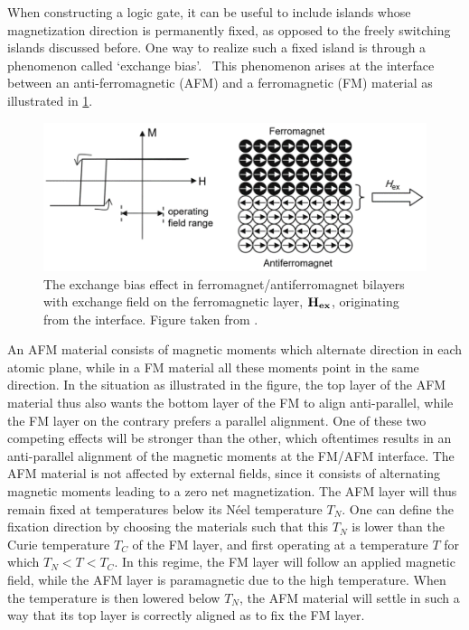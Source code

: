 \documentclass[11pt,a4paper,english]{article}
\begin{document}
When constructing a logic gate, it can be useful to include islands whose magnetization direction is permanently fixed, as opposed to the freely switching islands discussed before. One way to realize such a fixed island is through a phenomenon called `exchange bias'.~\cite{ExchangeBias_Mechanisms,ExchangeBias_nanostructures,ExchangeBias,syllabus_PoAEaPD} This phenomenon arises at the interface between an anti-ferromagnetic (AFM) and a ferromagnetic (FM) material as illustrated in \cref{fig:Intro_ExchangeBias}.
\begin{figure}[t]
    \centering
    \includegraphics[width=0.8\columnwidth]{Figures/Introduction/Syallabus_PoAEaPD - Figure 2.7.png}
    \caption{The exchange bias effect in ferromagnet/antiferromagnet bilayers with exchange field on the ferromagnetic layer, $\vb{H_{ex}}$, originating from the interface. Figure taken from \cite{syllabus_PoAEaPD}.}
    \label{fig:Intro_ExchangeBias}
\end{figure}
An AFM material consists of magnetic moments which alternate direction in each atomic plane, while in a FM material all these moments point in the same direction. In the situation as illustrated in the figure, the top layer of the AFM material thus also wants the bottom layer of the FM to align anti-parallel, while the FM layer on the contrary prefers a parallel alignment. One of these two competing effects will be stronger than the other, which oftentimes results in an anti-parallel alignment of the magnetic moments at the FM/AFM interface. The AFM material is not affected by external fields, since it consists of alternating magnetic moments leading to a zero net magnetization. The AFM layer will thus remain fixed at temperatures below its N\'{e}el temperature $T_N$. One can define the fixation direction by choosing the materials such that this $T_N$ is lower than the Curie temperature $T_C$ of the FM layer, and first operating at a temperature $T$ for which $T_N < T < T_C$. In this regime, the FM layer will follow an applied magnetic field, while the AFM layer is paramagnetic due to the high temperature. When the temperature is then lowered below $T_N$, the AFM material will settle in such a way that its top layer is correctly aligned as to fix the FM layer.~\cite{ExchangeBias_Mechanisms} \par
\end{document}
